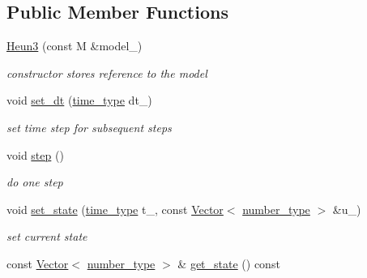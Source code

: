 \subsection*{Public Member Functions}
\begin{DoxyCompactItemize}
\item 
\hypertarget{classhdnum_1_1Heun3_a9994c2f6785c02199cbd2a35e9634a84}{
\hyperlink{classhdnum_1_1Heun3_a9994c2f6785c02199cbd2a35e9634a84}{Heun3} (const M \&model\_\-)}
\label{classhdnum_1_1Heun3_a9994c2f6785c02199cbd2a35e9634a84}

\begin{DoxyCompactList}\small\item\em constructor stores reference to the model \item\end{DoxyCompactList}\item 
\hypertarget{classhdnum_1_1Heun3_a438edc59b90c9a09b80f3d09c865bbda}{
void \hyperlink{classhdnum_1_1Heun3_a438edc59b90c9a09b80f3d09c865bbda}{set\_\-dt} (\hyperlink{classhdnum_1_1Heun3_a48fcfee8624c3e7984dc054d641ff962}{time\_\-type} dt\_\-)}
\label{classhdnum_1_1Heun3_a438edc59b90c9a09b80f3d09c865bbda}

\begin{DoxyCompactList}\small\item\em set time step for subsequent steps \item\end{DoxyCompactList}\item 
\hypertarget{classhdnum_1_1Heun3_ae216ddb0bf8459656dfb62c0a2fd1e69}{
void \hyperlink{classhdnum_1_1Heun3_ae216ddb0bf8459656dfb62c0a2fd1e69}{step} ()}
\label{classhdnum_1_1Heun3_ae216ddb0bf8459656dfb62c0a2fd1e69}

\begin{DoxyCompactList}\small\item\em do one step \item\end{DoxyCompactList}\item 
\hypertarget{classhdnum_1_1Heun3_a81644f725426f0aa5bb8ed5dc6d03cec}{
void \hyperlink{classhdnum_1_1Heun3_a81644f725426f0aa5bb8ed5dc6d03cec}{set\_\-state} (\hyperlink{classhdnum_1_1Heun3_a48fcfee8624c3e7984dc054d641ff962}{time\_\-type} t\_\-, const \hyperlink{classhdnum_1_1Vector}{Vector}$<$ \hyperlink{classhdnum_1_1Heun3_a4cda69fda9bfa3fb9d2a0ddeca50a29c}{number\_\-type} $>$ \&u\_\-)}
\label{classhdnum_1_1Heun3_a81644f725426f0aa5bb8ed5dc6d03cec}

\begin{DoxyCompactList}\small\item\em set current state \item\end{DoxyCompactList}\item 
\hypertarget{classhdnum_1_1Heun3_a776797bef464c76c1f7caa1f43bc9ccf}{
const \hyperlink{classhdnum_1_1Vector}{Vector}$<$ \hyperlink{classhdnum_1_1Heun3_a4cda69fda9bfa3fb9d2a0ddeca50a29c}{number\_\-type} $>$ \& \hyperlink{classhdnum_1_1Heun3_a776797bef464c76c1f7caa1f43bc9ccf}{get\_\-state} () const }
\label{classhdnum_1_1Heun3_a776797bef464c76c1f7caa1f43bc9ccf}


\end{DoxyCompactItemize}
